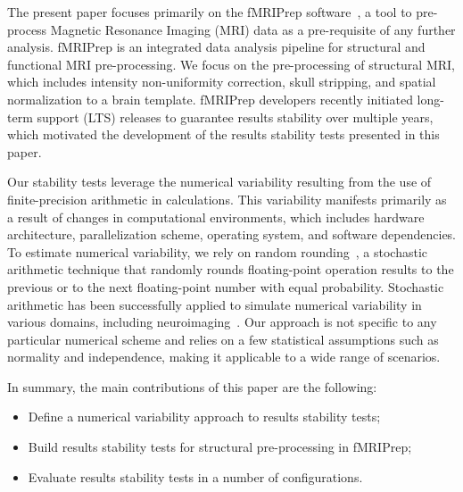 \documentclass[lettersize,journal]{IEEEtran}
\newcommand{\fmriprep}{fMRIPrep\xspace}
\begin{document}
The present paper focuses primarily on the \fmriprep software~\cite{esteban2019fmriprep}, a tool to pre-process Magnetic Resonance Imaging (MRI) data as a pre-requisite of any further analysis. \fmriprep is an integrated data analysis pipeline for structural and functional MRI pre-processing. We focus on the pre-processing of structural MRI, which includes intensity non-uniformity correction, skull stripping, and spatial normalization to a brain template. 
 \fmriprep developers recently initiated long-term support (LTS) releases to guarantee results stability over multiple years, which motivated the development of the results stability tests presented in this paper. 


Our stability tests leverage the numerical variability resulting from the use of finite-precision arithmetic in calculations. This variability manifests primarily as a result of changes in  computational environments, which includes hardware architecture, parallelization scheme, operating system, and software dependencies. To estimate numerical variability, we rely on random rounding~\cite{forsythe1959reprint}, a stochastic arithmetic technique that randomly rounds floating-point operation results to the previous or to the next floating-point number with equal probability. Stochastic arithmetic has been successfully applied to simulate numerical variability in various domains, including neuroimaging~\cite{salari2021accurate, kiar2021numerical}. Our approach is not specific to any particular numerical scheme and relies on a few statistical assumptions such as normality and independence, making it applicable to a wide range of scenarios.

In summary, the main contributions of this paper are the following:
\begin{itemize}
    \item Define a numerical variability approach to results stability tests;
    \item Build results stability tests for structural pre-processing in \fmriprep;
    \item Evaluate results stability tests in a number of configurations.
\end{itemize}
\end{document}
